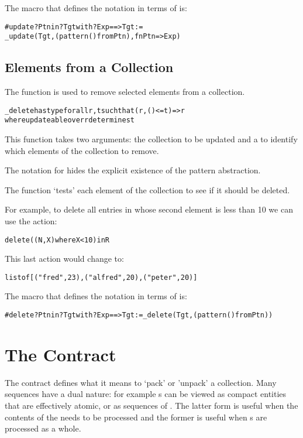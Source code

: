 The macro that defines the  notation in terms of  is:
\begin{alltt}
#update ?Ptn in ?Tgt with ?Exp ==> Tgt := 
   \_update(Tgt,(pattern() from Ptn),fn Ptn => Exp)
\end{alltt}


\subsection{ Elements from a Collection}
\label{delete}
The  function is used to remove selected elements from a collection.
\begin{alltt}
\_delete has type for all r,t such that (r, ()<=t) => r
                  where updateable over r determines t
\end{alltt}
This function takes two arguments: the collection to be updated and a  to identify which elements of the collection to remove.

\begin{aside}
The  notation for  hides the explicit existence of the pattern abstraction.
\end{aside}

The  function `tests' each element of the collection to see if it should be deleted.

For example, to delete all entries in   whose second element is less than 10 we can use the action:
\begin{alltt}
delete ((N,X) where X<10) in R
\end{alltt}
This last action would change  to:
\begin{alltt}
list of [ ("fred", 23), ("alfred",20), ("peter",20) ]
\end{alltt}

The macro that defines the  notation in terms of  is:
\begin{alltt}
#delete ?Ptn in ?Tgt with ?Exp ==> Tgt := \_delete(Tgt,(pattern() from Ptn))
\end{alltt}


\section{The  Contract}
\label{explosionContract}
The  contract defines what it means to `pack' or 'unpack' a collection. Many sequences have a dual nature: for example s can be viewed as compact entities that are effectively atomic, or as sequences of . The latter form is useful when the contents of the  needs to be processed and the former is useful when s are processed as a whole.

